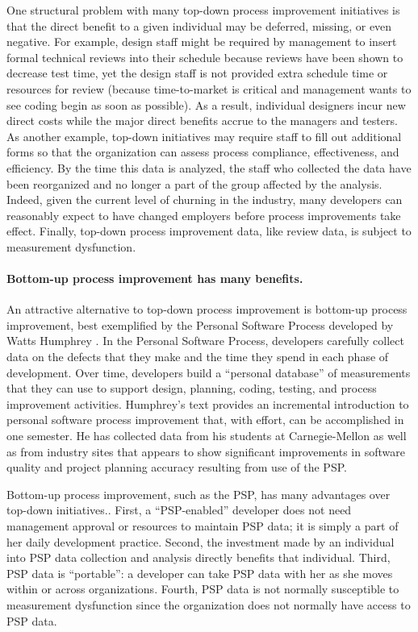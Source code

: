 One structural problem with many top-down process improvement initiatives
is that the direct benefit to a given individual may be deferred, missing,
or even negative. For example, design staff might be required by management
to insert formal technical reviews into their schedule because reviews have
been shown to decrease test time, yet the design staff is not provided
extra schedule time or resources for review (because time-to-market is
critical and management wants to see coding begin as soon as possible). As
a result, individual designers incur new direct costs while the major
direct benefits accrue to the managers and testers. As another example,
top-down initiatives may require staff to fill out additional forms so
that the organization can assess process compliance, effectiveness, and
efficiency. By the time this data is analyzed, the staff who collected the
data have been reorganized and no longer a part of the group affected by
the analysis. Indeed, given the current level of churning in the industry, 
many developers can reasonably expect to have changed employers before
process improvements take effect.  Finally, top-down process improvement
data, like review data, is subject to measurement dysfunction.

\paragraph{Bottom-up process improvement has many benefits.}

An attractive alternative to top-down process improvement is bottom-up
process improvement, best exemplified by the Personal Software Process
developed by Watts Humphrey \cite{Humphrey95}.  In the Personal Software
Process, developers carefully collect data on the defects that they make
and the time they spend in each phase of development.  Over time,
developers build a ``personal database'' of measurements that they can use
to support design, planning, coding, testing, and process improvement
activities.  Humphrey's text provides an incremental introduction to
personal software process improvement that, with effort, can be
accomplished in one semester.  He has collected data from his
students at Carnegie-Mellon as well as from industry sites that appears to
show significant improvements in software quality and project planning
accuracy resulting from use of the PSP.

Bottom-up process improvement, such as the PSP, has many advantages
over top-down initiatives.. First, a ``PSP-enabled'' developer
does not need management approval or resources to maintain PSP data; it is
simply a part of her daily development practice.  Second, the investment
made by an individual into PSP data collection and analysis directly
benefits that individual.  Third, PSP data is ``portable'': a developer can
take PSP data with her as she moves within or across organizations. Fourth,
PSP data is not normally susceptible to measurement dysfunction since the
organization does not normally have access to PSP data.

